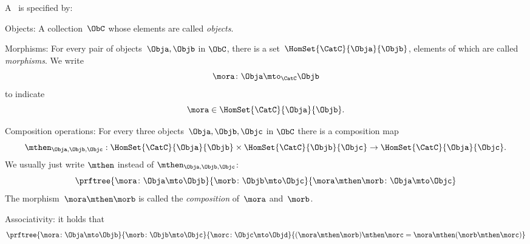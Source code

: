 \begin{ctdefinition}[Semicategory]
    \label{def:semicategory-compact}
    A \emph{}~\CatC is specified by:
    \begin{body}
        \constit
        \begin{compactenum}
            \item Objects: A collection\footnotemark~$\ObC$ whose elements are called \emph{objects}.
            \item Morphisms: For every pair of objects~$\Obja,\Objb$ in $\ObC$, there is a set~$\HomSet{\CatC}{\Obja}{\Objb}$, elements of which are called \emph{morphisms}.
We write
            \begin{equation}
                \mora \colon \Obja \mto_\CatC \Objb
            \end{equation}
            to indicate
            \begin{equation}
                \mora \in \HomSet{\CatC}{\Obja}{\Objb}.
            \end{equation}
            \item Composition operations: For every three objects~$\Obja,\Objb,\Objc$ in $\ObC$ there is a composition map
            \begin{equation}
                \mthen_{\Obja,\Objb,\Objc}: \HomSet{\CatC}{\Obja}{\Objb} \times \HomSet{\CatC}{\Objb}{\Objc}\to \HomSet{\CatC}{\Obja}{\Objc}.
            \end{equation}
            We usually just write $\mthen$ instead of $\mthen_{\Obja,\Objb,\Objc}$:
            \begin{equation}
                \prftree{\mora \colon \Obja \mto \Objb}{\morb\colon \Objb \mto \Objc}{\mora \mthen \morb \colon \Obja \mto \Objc}
            \end{equation}
            The morphism~$\mora \mthen \morb$ is called the \emph{composition} of~$\mora$ and~$\morb$.
        \end{compactenum}
        \condit
        \begin{compactenum}
            \item Associativity: it holds that
            \begin{equation}
                \prftree{\mora\colon \Obja \mto \Objb}{\morb\colon \Objb \mto \Objc}{\morc\colon \Objc \mto \Objd}
                {
                    (\mora\mthen \morb)
                    \mthen \morc= \mora \mthen (\morb \mthen \morc)
                }
            \end{equation}
        \end{compactenum}
    \end{body}
\end{ctdefinition}


